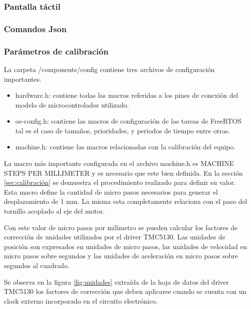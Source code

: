 \subsubsection{Pantalla táctil}

\subsubsection{Comandos Json}




 
\subsubsection{Parámetros de calibración}
\label{subsec:calibracion}

La carpeta /components/config contiene tres archivos de configuración importantes.
\begin{itemize}
\item hardware.h: contiene todas las macros referidas a los pines de conexión del modelo de microcontrolador utilizado.

\item os-config.h: contiene las macros de configuración de las tareas de FreeRTOS tal es el caso de tamaños, prioridades, y periodos de tiempo entre otras.
\item machine.h: contiene las macros relacionadas con la calibración del equipo.
\end{itemize}


La macro más importante configurada en el archivo machine.h es MACHINE STEPS PER MILLIMETER y es necesario que este bien definida. En la sección \ref{sec:calibración} se demuestra el procedimiento realizado para definir su valor. Esta macro define la cantidad de micro pasos necesarios para generar el desplazamiento de 1 mm. La misma esta completamente relaciona con el paso del tornillo acoplado al eje del motor.

Con este valor de micro pasos por milímetro se pueden calcular los factores de corrección de unidades utilizados por el driver TMC5130. Las unidades de posición son expresados en unidades de micro pasos, las unidades de velocidad en micro pasos sobre segundos y las unidades de aceleración en micro pasos sobre segundos al cuadrado.

Se observa en la figura \ref{fig:unidades} extraída de la hoja de datos del driver TMC5130 \citep{3_web_trinamic_producto} los factores de corrección que deben aplicarse cuando se cuenta con un clock externo incorporado en el circuito electrónico.

